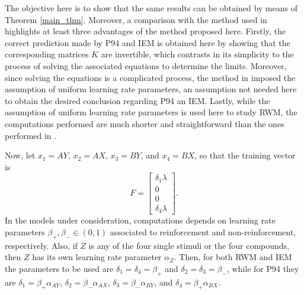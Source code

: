 \documentclass[]{interact}
\theoremstyle{plain}%
\theoremstyle{definition}
\theoremstyle{remark}
\begin{document}
The objective here is to show that the same results can be obtained by means of Theorem \ref{main_thm}. Moreover, a comparison with the method used in \cite{A24} highlights at least three advantages of the method proposed here. Firstly, the correct prediction made by P94 and IEM is obtained here by showing that the corresponding matrices $K$ are invertible, which contrasts in its simplicity to the process of solving the associated equations to determine the limits. Moreover, since solving the equations is a complicated process, the method in \citep{A24} imposed the assumption of uniform learning rate parameters, an assumption not needed here to obtain the desired conclusion regarding P94 an IEM. Lastly, while the assumption of uniform learning rate parameters is used here to study RWM, the computations performed are much shorter and straightforward than the ones performed in \citep{A24}.

Now, let $x_1=AY$, $x_2=AX$, $x_3=BY$, and $x_4=BX$, so that the training vector is
\[
F=\begin{bmatrix}
\delta_1\lambda\\
0\\
0\\
\delta_4 \lambda
\end{bmatrix}.
\]
In the models under consideration, computations depends on learning rate parameters $\beta_{+},\beta_{-}\in (0,1)$ associated to reinforcement and non-reinforcement, respectively. Also, if $Z$ is any of the four single stimuli or the four compounds, then $Z$ has its own learning rate parameter $\alpha_Z$. 
Then, for both RWM and IEM the parameters to be used are $\delta_1=\delta_4=\beta_+$ and $\delta_2=\delta_3=\beta_{-}$, while for P94 they are $\delta_1=\beta_+\alpha_{AY}$, $\delta_2=\beta_-\alpha_{AX}$, $\delta_3=\beta_-\alpha_{BY}$, and $\delta_4=\beta_+\alpha_{BX}$.
\end{document}
